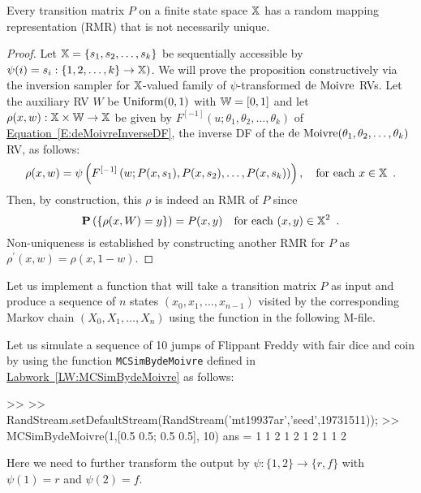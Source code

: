 \begin{prop}
Every transition matrix $P$ on a finite state space $\mathbb{X}$ has a random mapping representation (RMR) that is not necessarily unique.
\begin{proof}
Let $\mathbb{X} = \{s_1,s_2,\ldots,s_k\}$ be sequentially accessible by $\psi(i)=s_i :  \{1,2,\ldots,k\} \to \mathbb{X})$.   We will prove the proposition constructively via the inversion sampler for $\mathbb{X}$-valued family of $\psi$-transformed $\mbox{{\rm de~Moivre}}$ RVs.  Let the auxiliary RV $W$ be $\mbox{{\rm Uniform}}(0,1)$ with $\mathbb{W}=[0,1]$ and let $\rho(x,w): \mathbb{X} \times \mathbb{W} \to \mathbb{X}$ be given by $F^{[-1]}(u;\theta_1,\theta_2,\ldots,\theta_k)$ of \hyperref[E:deMoivreInverseDF]{Equation~\ref*{E:deMoivreInverseDF}}, the inverse DF of the $\mbox{{\rm de~Moivre}}(\theta_1,\theta_2,\ldots,\theta_k)$ RV, as follows:
\[
\rho(x,w) = \psi \left( F^{[-1]}\left(w; P(x,s_1), P(x,s_2), \ldots, P(x,s_k) \right) \right), \quad \text{for each } x \in \mathbb{X} \enspace .
\]
Then, by construction, this $\rho$ is indeed an RMR of $P$ since
\[
\mathbf{P} \left( \{ \rho(x,W)=y \} \right) = P(x,y) \quad \text{for each } (x,y) \in \mathbb{X}^2 \enspace .
\]
Non-uniqueness is established by constructing another RMR for $P$ as $\rho^\prime(x,w) = \rho(x,1-w)$.
\end{proof}
\end{prop}

\begin{labwork}\label{LW:MCSimBydeMoivre}
Let us implement a function that will take a transition matrix $P$ as input and produce a sequence of $n$ states $(x_0,x_1,\ldots,x_{n-1})$ visited by the corresponding Markov chain $(X_0,X_1,\ldots, X_n)$ using the function in the following M-file.
\end{labwork}

\begin{simulation}\label{SIM:FlippantFreddyByMCSimBydeMoivre}
Let us simulate a sequence of 10 jumps of Flippant Freddy with fair dice and coin by using the function {\tt MCSimBydeMoivre} defined in \hyperref[LW:MCSimBydeMoivre]{Labwork~\ref*{LW:MCSimBydeMoivre}} as follows:
\begin{VrbM}
>> %
>> RandStream.setDefaultStream(RandStream('mt19937ar','seed',19731511));
>> MCSimBydeMoivre(1,[0.5 0.5; 0.5 0.5], 10)
ans =     1     1     2     1     2     1     2     1     1     2
\end{VrbM}
Here we need to further transform the output by $\psi: \{1,2\} \to \{r,f\}$ with $\psi(1)=r$ and $\psi(2)=f$.
\end{simulation}

